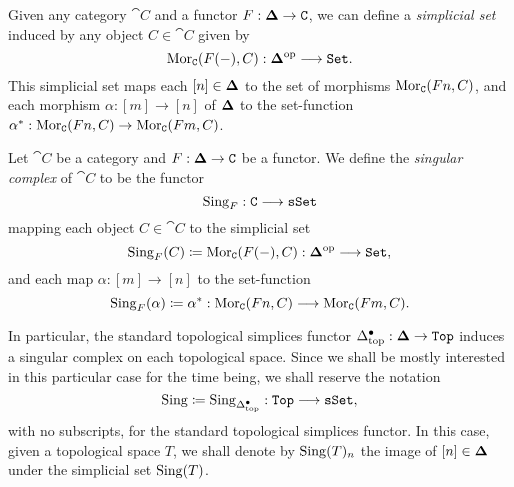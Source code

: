 Given any category \(\cat C\) and a functor \(F: {\mathbf{\Delta}} \to \texttt C\), we can
define a \emph{simplicial set} induced by any object \(C \in \cat C\) given by
\[
\operatorname{Mor}_{\texttt C}(F(-), C): {\mathbf{\Delta}}^{\mathrm{op}} \longrightarrow {\texttt{Set}}.
\]
This simplicial set maps each \([n] \in {\mathbf{\Delta}}\) to the set of morphisms
\(\operatorname{Mor}_{\texttt C}(F n, C)\), and each morphism \(\alpha: [m] \to [n]\) of
\({\mathbf{\Delta}}\) to the set-function
\(\alpha^{*}: \operatorname{Mor}_{\texttt C}(F n, C) \to \operatorname{Mor}_{\texttt C}(F m, C)\).


\begin{definition}
\label{def:singular-complex-functor}
Let \(\cat C\) be a category and \(F: {\mathbf{\Delta}} \to \texttt C\) be a functor. We define
the \emph{singular complex} of \(\cat C\) to be the functor
\[
\operatorname{Sing}_F: \texttt C \longrightarrow {\texttt{sSet}}
\]
mapping each object \(C \in \cat C\) to the simplicial set
\[
\operatorname{Sing}_F(C) \coloneq \operatorname{Mor}_{\texttt C}(F(-), C): {\mathbf{\Delta}}^{\mathrm{op}} \longrightarrow {\texttt{Set}},
\]
and each map \(\alpha: [m] \to [n]\) to the set-function
\[
\operatorname{Sing}_F(\alpha) \coloneq \alpha^{*}:
\operatorname{Mor}_{\texttt C}(F n, C) \longrightarrow \operatorname{Mor}_{\texttt C}(F m, C).
\]

In particular, the standard topological simplices functor \(\Delta_{\text{top}}^{\bullet}: {\mathbf{\Delta}} \to
{\texttt{Top}}\) induces a singular complex on each topological space. Since we shall be
mostly interested in this particular case for the time being, we shall reserve
the notation
\[
\operatorname{Sing} \coloneq \operatorname{Sing}_{\Delta_{\text{top}}^{\bullet}}: {\texttt{Top}} \longrightarrow {\texttt{sSet}},
\]
with no subscripts, for the standard topological simplices functor. In this
case, given a topological space \(T\), we shall denote by \(\operatorname{Sing}(T)_n\) the
image of \([n] \in {\mathbf{\Delta}}\) under the simplicial set \(\operatorname{Sing}(T)\).
\end{definition}

